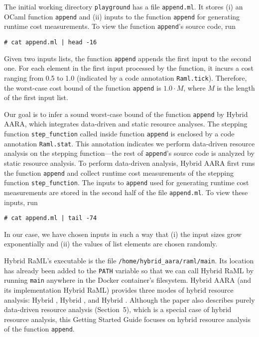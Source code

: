 The initial working directory \texttt{playground} has a file \texttt{append.ml}.
%
It stores (i) an OCaml function \texttt{append} and (ii) inputs to the function
\texttt{append} for generating runtime cost measurements.
%
To view the function \texttt{append}'s source code, run
\begin{verbatim}
# cat append.ml | head -16
\end{verbatim}

Given two inputs lists, the function \texttt{append} appends the first input to
the second one.
%
For each element in the first input processed by the function, it incurs a cost
ranging from 0.5 to 1.0 (indicated by a code annotation \texttt{Raml.tick}).
%
Therefore, the worst-case cost bound of the function \texttt{append} is $1.0 \cdot M$, where $M$
is the length of the first input list.

Our goal is to infer a sound worst-case bound of the function \texttt{append} by
Hybrid AARA, which integrates data-driven and static resource analyses.
%
The stepping function \texttt{step\_function} called inside function
\texttt{append} is enclosed by a code annotation \texttt{Raml.stat}.
%
This annotation indicates we perform data-driven resource analysis on the
stepping function---the rest of \texttt{append}'s source code is analyzed by
static resource analysis.
%
To perform data-driven analysis, Hybrid AARA first runs the function
\texttt{append} and collect runtime cost measurements of the stepping function
\texttt{step\_function}.
%
The inputs to \texttt{append} used for generating runtime cost measurements are
stored in the second half of the file \texttt{append.ml}.
%
To view these inputs, run
\begin{verbatim}
# cat append.ml | tail -74
\end{verbatim}
%
In our case, we have chosen inputs in such a way that (i) the input sizes grow
exponentially and (ii) the values of list elements are chosen randomly.

Hybrid RaML's executable is the file \texttt{/home/hybrid\_aara/raml/main}.
%
Its location has already been added to the \texttt{PATH} variable so that we can
call Hybrid RaML by running \texttt{main} anywhere in the Docker container's
filesystem.
%
Hybrid AARA (and its implementation Hybrid RaML) provides three modes of hybrid
resource analysis: Hybrid \Opt{}, Hybrid \BayesWC{}, and Hybrid \BayesPC{}.
%
Although the paper also describes purely data-driven resource analysis
(Section~5), which is a special case of hybrid resource analysis, this Getting
Started Guide focuses on hybrid resource analysis of the function
\texttt{append}.

